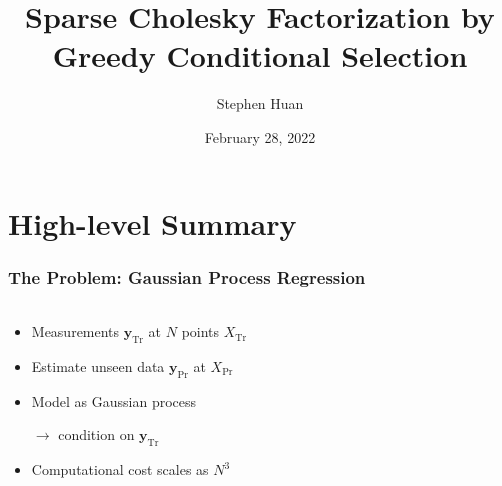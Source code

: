 \documentclass{beamer}                             %
\title[]{Sparse Cholesky Factorization by \\ Greedy Conditional Selection}
\subtitle{}
\author[Huan]
{Stephen Huan}
\institute[Georgia Institute of Technology]
{
  Theory Club
}
\date[]{February 28, 2022}
\renewcommand{\vec}[1]{\bm{#1}}
\begin{document}

\section{High-level Summary}

\begin{frame}
\frametitle{The Problem: Gaussian Process Regression}
\framesubtitle{}
  \begin{columns}
    \begin{column}{0.6\textwidth}
      \begin{itemize}
        \item<+-> Measurements \( \vec{y}_\text{Tr} \) at
          \( N \) points \( X_\text{Tr} \)

        \item<+-> Estimate unseen data \(
          \vec{y}_\text{Pr} \) at \( X_\text{Pr} \)

        \item<+-> Model as Gaussian process

          \( \rightarrow \) condition on \( \vec{y}_\text{Tr} \)

        \item<+-> Computational cost scales as \( N^3 \)


\end{itemize}
\end{column}
\end{columns}
\end{frame}
\end{document}
